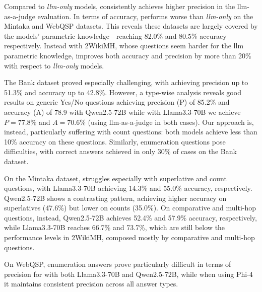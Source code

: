 % 
Compared to \textit{\ac{llm}-only} models,  consistently achieves higher precision in the \ac{llm}-as-a-judge evaluation.
%
In terms of accuracy,  performs worse than \textit{\ac{llm}-only} on the Mintaka and WebQSP datasets. This reveals these datasets are largely covered by the models' parametric knowledge---reaching 82.0\% and 80.5\% accuracy respectively.
%
% 
%
Instead with 2WikiMH, %
whose questions seem harder for the \ac{llm} parametric knowledge,
 improves both accuracy and precision by more than 20\% with respect to \textit{\ac{llm}-only} models.
% 

The Bank dataset proved especially challenging, with  achieving precision up to 51.3\% and accuracy up to 42.8\%. However, a type-wise analysis reveals good results on generic Yes/No questions achieving precision (P) of 85.2\% and accuracy (A) of 78.9 with Qwen2.5-72B while with Llama3.3-70B we achieve $P=77.8\%$ and $A=70.6\%$ (using \ac{llm}-as-a-judge in both cases). Our approach is, instead, particularly suffering with count questions: both models achieve less than 10\% accuracy on these questions. Similarly, enumeration questions pose difficulties, with correct answers achieved in only 30\% of cases on the Bank dataset.


On the Mintaka dataset,  struggles especially with superlative and count questions, with Llama3.3-70B achieving 14.3\% and 55.0\% accuracy, respectively. Qwen2.5-72B shows a contrasting pattern, achieving higher accuracy on superlatives (47.6\%) but lower on counts (35.0\%).
On comparative and multi-hop questions, instead, Qwen2.5-72B achieves 52.4\% and 57.9\% accuracy, respectively, while Llama3.3-70B reaches 66.7\% and 73.7\%, which are still below the performance levels in 2WikiMH, composed mostly by comparative and multi-hop questions. 

On WebQSP, enumeration answers prove particularly difficult in terms of precision for  with both Llama3.3-70B and Qwen2.5-72B, while when using Phi-4 it maintains consistent precision across all answer types.

